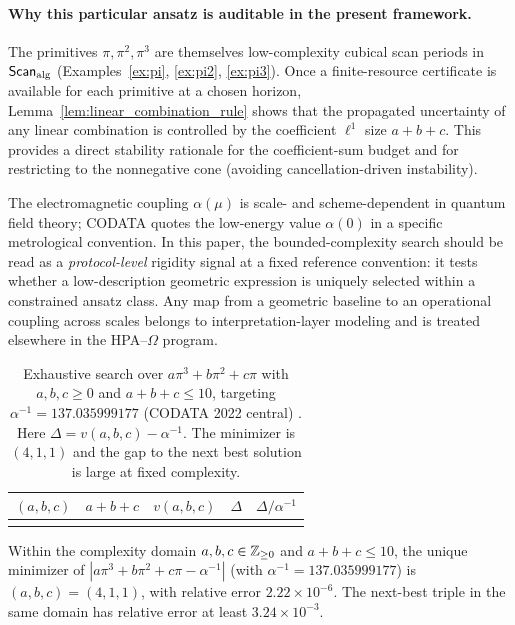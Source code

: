 \paragraph{Why this particular ansatz is auditable in the present framework.}
The primitives $\pi,\pi^2,\pi^3$ are themselves low-complexity cubical scan periods in $\mathsf{Scan}_{\mathrm{alg}}$ (Examples~\ref{ex:pi}, \ref{ex:pi2}, \ref{ex:pi3}). Once a finite-resource certificate is available for each primitive at a chosen horizon, Lemma~\ref{lem:linear_combination_rule} shows that the propagated uncertainty of any linear combination is controlled by the coefficient $\ell^1$ size $a+b+c$. This provides a direct stability rationale for the coefficient-sum budget and for restricting to the nonnegative cone (avoiding cancellation-driven instability).

\begin{remark}
The electromagnetic coupling $\alpha(\mu)$ is scale- and scheme-dependent in quantum field theory; CODATA quotes the low-energy value $\alpha(0)$ in a specific metrological convention. In this paper, the bounded-complexity search should be read as a \emph{protocol-level} rigidity signal at a fixed reference convention: it tests whether a low-description geometric expression is uniquely selected within a constrained ansatz class. Any map from a geometric baseline to an operational coupling across scales belongs to interpretation-layer modeling and is treated elsewhere in the HPA--$\Omega$ program.
\end{remark}

\begin{table}[t]
\centering
\begin{tabular}{@{}rrrrr@{}}
\toprule
$(a,b,c)$ & $a+b+c$ & $v(a,b,c)$ & $\Delta$ & $\Delta/\alpha^{-1}$ \\
\midrule

\\
\bottomrule
\end{tabular}
\caption{Exhaustive search over $a\pi^3+b\pi^2+c\pi$ with $a,b,c\ge 0$ and $a+b+c\le 10$, targeting $\alpha^{-1}=137.035999177$ (CODATA 2022 central) \cite{CODATA2022RMP}. Here $\Delta=v(a,b,c)-\alpha^{-1}$. The minimizer is $(4,1,1)$ and the gap to the next best solution is large at fixed complexity.}
\label{tab:alpha_integer_search}
\end{table}

\begin{proposition}
\label{prop:alpha_integer_rigidity_mai}
Within the complexity domain $a,b,c\in\mathbb{Z}_{\ge 0}$ and $a+b+c\le 10$, the unique minimizer of $|a\pi^3+b\pi^2+c\pi-\alpha^{-1}|$ (with $\alpha^{-1}=137.035999177$) is $(a,b,c)=(4,1,1)$, with relative error $2.22\times 10^{-6}$. The next-best triple in the same domain has relative error at least $3.24\times 10^{-3}$.
\end{proposition}

